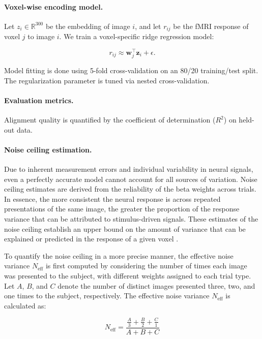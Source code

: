 \documentclass{article}
\theoremstyle{plain}
\theoremstyle{definition}
\theoremstyle{remark}
\begin{document}
\paragraph{Voxel-wise encoding model.} 
Let $z_i \in \mathbb{R}^{300}$ be the embedding of image $i$, and let $r_{ij}$ be the fMRI response of voxel $j$ to image $i$. We train a voxel-specific ridge regression model:

\begin{equation}
r_{ij} \approx \mathbf{w}_j^\top \mathbf{z}_i + \epsilon.
\end{equation}

Model fitting is done using 5-fold cross-validation on an 80/20 training/test split. The regularization parameter is tuned via nested cross-validation.

\paragraph{Evaluation metrics.} 
Alignment quality is quantified by the coefficient of determination ($R^2$) on held-out data.

\paragraph{Noise ceiling estimation.}

Due to inherent measurement errors and individual variability in neural signals, even a perfectly accurate model cannot account for all sources of variation. Noise ceiling estimates are derived from the reliability of the beta weights across trials. In essence, the more consistent the neural response is across repeated presentations of the same image, the greater the proportion of the response variance that can be attributed to stimulus-driven signals. These estimates of the noise ceiling establish an upper bound on the amount of variance that can be explained or predicted in the response of a given voxel \citep{allen2022massive}.

To quantify the noise ceiling in a more precise manner, the effective noise variance \( N_{\text{eff}} \) is first computed by considering the number of times each image was presented to the subject, with different weights assigned to each trial type. Let \( A \), \( B \), and \( C \) denote the number of distinct images presented three, two, and one times to the subject, respectively. The effective noise variance \( N_{\text{eff}} \) is calculated as:

\[
N_{\text{eff}} = \frac{\frac{A}{3} + \frac{B}{2} + \frac{C}{1}}{A + B + C}
\]
\end{document}
